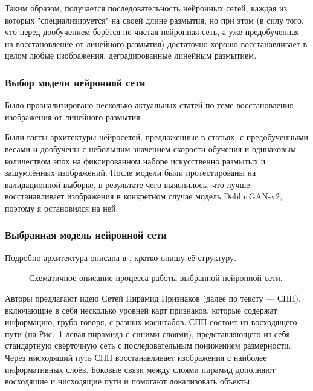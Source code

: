Таким образом, получается последовательность нейронных сетей, каждая из которых "специализируется" на своей длине размытия, но при этом (в силу того, что перед дообучением берётся не чистая нейронная сеть, а уже предобученная на восстановление от линейного размытия) достаточно хорошо восстанавливает в целом любые изображения, деградированные линейным размытием. 

\subsubsection{Выбор модели нейронной сети}
Было проанализировано несколько актуальных статей по теме восстановления изображения от линейного размытия \cite{dganv2, jin, srn}.

Были взяты архитектуры нейросетей, предложенные в статьях, с предобученными весами и дообучены с небольшим значением скорости обучения и одинаковым количеством эпох на фиксированном наборе искусственно размытых и зашумлённых изображений. После модели были протестированы на валидационной выборке, в результате чего выяснилось, что лучше восстанавливает изображения в конкретном случае модель DeblurGAN-v2, поэтому я остановился на ней.

\subsubsection{ Выбранная модель нейронной сети}

Подробно архитектура описана в \cite{dganv2}, кратко опишу её структуру.

\begin{figure}[H]
\begin{minipage}[h]{1\linewidth}
\end{minipage}
\caption{ Схематичное описание процесса работы выбранной нейронной сети.}
\label{ris:dgan_arch}
\end{figure}

Авторы предлагают идею Сетей Пирамид Признаков (далее по тексту --- СПП), включающие в себя несколько уровней карт признаков, которые содержат информацию, грубо говоря, с разных масштабов. СПП состоит из восходящего пути (на Рис.~\ref{ris:dgan_arch} левая пирамида с синими слоями), представляющего из себя стандартную свёрточную сеть с последовательным понижением размерности. Через нисходящий путь СПП восстанавливает изображения с наиболее информативных слоёв. Боковые связи между слоями пирамид дополняют восходящие и нисходящие пути и помогают локализовать объекты.

